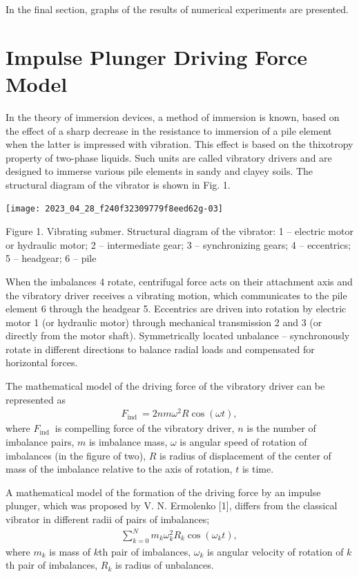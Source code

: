 \documentclass[
11pt,%
tightenlines,%
twoside,%
onecolumn,%
nofloats,%
nobibnotes,%
nofootinbib,%
superscriptaddress,%
noshowpacs,%
centertags]%
{revtex4}
\begin{document}
In the final section, graphs of the results of numerical
experiments are presented.

\section{Impulse Plunger Driving Force Model}
In the theory of immersion devices, a method of  immersion is known,
based on the effect of a sharp decrease in the resistance to
immersion of a pile element when the latter is impressed with
vibration. This effect is based on the thixotropy property of
two-phase liquids. Such units are called vibratory drivers and are
designed to immerse various pile elements in sandy and clayey soils.
The structural diagram of the vibrator is shown in Fig. 1.

\begin{center}
\texttt{[image: 2023\_04\_28\_f240f32309779f8eed62g-03]}
\end{center}

Figure 1. Vibrating submer. Structural diagram of the vibrator: 1 --
electric motor or hydraulic motor; 2 -- intermediate gear; 3 --
synchronizing gears; 4 -- eccentrics; 5 -- headgear; 6 -- pile

When the imbalances 4 rotate, centrifugal force  acts on their
attachment axis and the vibratory driver receives a vibrating
motion, which communicates to the pile element 6 through the
headgear 5. Eccentrics are driven into rotation by electric motor 1
(or hydraulic motor) through mechanical transmission 2 and 3 (or
directly from the motor shaft). Symmetrically located unbalance --
synchronously rotate in different directions to balance radial loads
and compensated for horizontal forces.

The mathematical model of the driving force of the vibratory driver
can be represented as
\begin{eqnarray}
F_{\text {ind }}=2 n m \omega^{2} R \cos (\omega t), \label{eq:eq_1}
\end{eqnarray}
where $F_{\text {ind }}$ is compelling force of the vibratory
driver, $n$  is the number of imbalance pairs, $m$ is imbalance
mass, $\omega$ is angular speed of rotation of imbalances (in the
figure of two), $R$ is radius of displacement of the center of mass
of the imbalance relative to the axis of rotation, $t$ is time.

A mathematical model of the formation of the driving force by  an
impulse plunger, which was proposed by V. N. Ermolenko [1], differs
from the classical vibrator in different radii of pairs of
imbalances;
\begin{eqnarray*}
\sum_{k=0}^{N} m_{k} \omega_{k}^{2} R_{k} \cos \left(\omega_{k}
t\right),
\end{eqnarray*}
where $m_{k}$ is mass of $k$th pair of imbalances, $\omega_{k}$ is
angular velocity of rotation of $k$th pair of imbalances, $R_{k}$ is
radius of unbalances.
\end{document}
